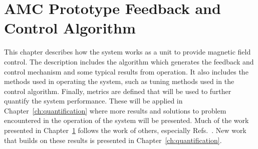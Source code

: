 
\chapter{AMC Prototype Feedback and Control Algorithm}\label{ch:operation}







This chapter describes how the system works as a unit to provide magnetic field control. The description includes the algorithm which generates the feedback and control mechanism and some typical results from operation.  It also includes the methods used in operating the system, such as tuning methods used in the control algorithm. Finally, metrics are defined that will be used to further quantify the system performance. These will be applied in Chapter~\ref{ch:quantification} where more results and solutions to problem encountered in the operation of the system will be presented. Much of the work presented in Chapter~\ref{ch:operation} follows the work of others, especially Refs.~\cite{bea,rawlik,lins}.  New work that builds on these results is presented in Chapter~\ref{ch:quantification}.

